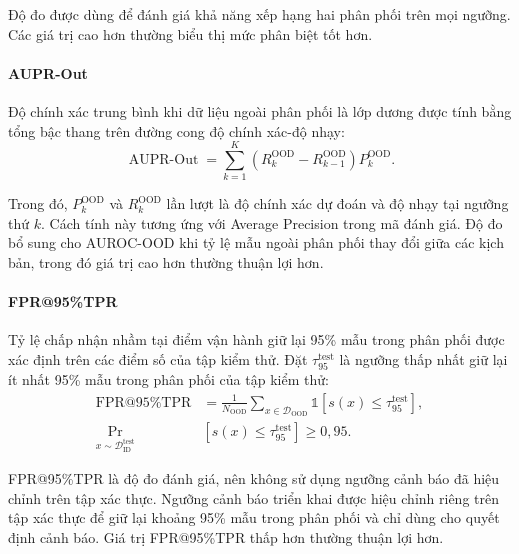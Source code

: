 Độ đo được dùng để đánh giá khả năng xếp hạng hai phân phối trên mọi ngưỡng. Các giá trị cao hơn thường biểu thị mức phân biệt tốt hơn.

\paragraph{AUPR-Out}

Độ chính xác trung bình khi dữ liệu ngoài phân phối là lớp dương \cite{Hendrycks2017MSP,Liang2018ODIN} được tính bằng tổng bậc thang trên đường cong độ chính xác-độ nhạy:
\begin{equation}
\operatorname{AUPR\text{-}Out}
=\sum_{k=1}^{K}
\left(R^{\mathrm{OOD}}_k-R^{\mathrm{OOD}}_{k-1}\right)
P^{\mathrm{OOD}}_k.
\label{eq:ch4_aupr_out}
\end{equation}

Trong đó, $P^{\mathrm{OOD}}_k$ và $R^{\mathrm{OOD}}_k$ lần lượt là độ chính xác dự đoán và độ nhạy tại ngưỡng thứ $k$. Cách tính này tương ứng với Average Precision trong mã đánh giá. Độ đo bổ sung cho AUROC-OOD khi tỷ lệ mẫu ngoài phân phối thay đổi giữa các kịch bản, trong đó giá trị cao hơn thường thuận lợi hơn.

\paragraph{FPR@95\%TPR}

Tỷ lệ chấp nhận nhầm tại điểm vận hành giữ lại 95\% mẫu trong phân phối \cite{Liang2018ODIN,Liu2020EnergyOOD} được xác định trên các điểm số của tập kiểm thử. Đặt $\tau_{95}^{\mathrm{test}}$ là ngưỡng thấp nhất giữ lại ít nhất 95\% mẫu trong phân phối của tập kiểm thử:
\begin{equation}
\begin{aligned}
\operatorname{FPR@95\%TPR}
&=\frac{1}{N_{\mathrm{OOD}}}\sum_{x\in\mathcal{D}_{\mathrm{OOD}}}
\mathbb{1}\!\left[s(x)\leq\tau_{95}^{\mathrm{test}}\right],\\
\Pr_{x\sim\mathcal{D}_{\mathrm{ID}}^{\mathrm{test}}}
&\!\left[s(x)\leq\tau_{95}^{\mathrm{test}}\right]\geq0{,}95.
\end{aligned}
\label{eq:ch4_fpr95}
\end{equation}

FPR@95\%TPR là độ đo đánh giá, nên không sử dụng ngưỡng cảnh báo đã hiệu chỉnh trên tập xác thực. Ngưỡng cảnh báo triển khai được hiệu chỉnh riêng trên tập xác thực để giữ lại khoảng 95\% mẫu trong phân phối và chỉ dùng cho quyết định cảnh báo. Giá trị FPR@95\%TPR thấp hơn thường thuận lợi hơn.

